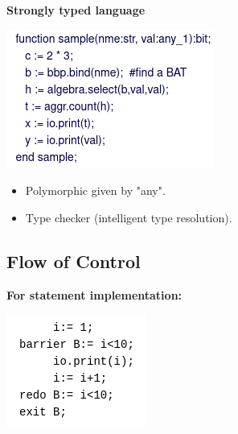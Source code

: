 \documentclass[11pt]{article}
\begin{document}
\textbf{Strongly typed language}

\begin{center}
\includegraphics[width=.9\linewidth]{./Pictures/poly-ex.png}
\end{center}

\begin{itemize}
\item Polymorphic given by "any".
\item Type checker (intelligent type resolution).
\end{itemize}

\subsection{Flow of Control}
\label{sec:org4750386}

\textbf{For statement implementation:}
\begin{center}
\includegraphics[width=.9\linewidth]{./Pictures/for-ex.png}
\end{center}
\end{document}
